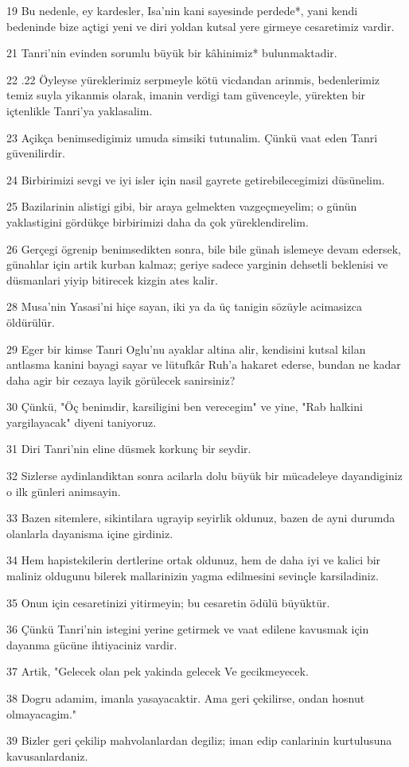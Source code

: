 \par 19 Bu nedenle, ey kardesler, Isa'nin kani sayesinde perdede*, yani kendi bedeninde bize açtigi yeni ve diri yoldan kutsal yere girmeye cesaretimiz vardir.
\par 21 Tanri'nin evinden sorumlu büyük bir kâhinimiz* bulunmaktadir.
\par 22 .22 Öyleyse yüreklerimiz serpmeyle kötü vicdandan arinmis, bedenlerimiz temiz suyla yikanmis olarak, imanin verdigi tam güvenceyle, yürekten bir içtenlikle Tanri'ya yaklasalim.
\par 23 Açikça benimsedigimiz umuda simsiki tutunalim. Çünkü vaat eden Tanri güvenilirdir.
\par 24 Birbirimizi sevgi ve iyi isler için nasil gayrete getirebilecegimizi düsünelim.
\par 25 Bazilarinin alistigi gibi, bir araya gelmekten vazgeçmeyelim; o günün yaklastigini gördükçe birbirimizi daha da çok yüreklendirelim.
\par 26 Gerçegi ögrenip benimsedikten sonra, bile bile günah islemeye devam edersek, günahlar için artik kurban kalmaz; geriye sadece yarginin dehsetli beklenisi ve düsmanlari yiyip bitirecek kizgin ates kalir.
\par 28 Musa'nin Yasasi'ni hiçe sayan, iki ya da üç tanigin sözüyle acimasizca öldürülür.
\par 29 Eger bir kimse Tanri Oglu'nu ayaklar altina alir, kendisini kutsal kilan antlasma kanini bayagi sayar ve lütufkâr Ruh'a hakaret ederse, bundan ne kadar daha agir bir cezaya layik görülecek sanirsiniz?
\par 30 Çünkü, "Öç benimdir, karsiligini ben verecegim" ve yine, "Rab halkini yargilayacak" diyeni taniyoruz.
\par 31 Diri Tanri'nin eline düsmek korkunç bir seydir.
\par 32 Sizlerse aydinlandiktan sonra acilarla dolu büyük bir mücadeleye dayandiginiz o ilk günleri animsayin.
\par 33 Bazen sitemlere, sikintilara ugrayip seyirlik oldunuz, bazen de ayni durumda olanlarla dayanisma içine girdiniz.
\par 34 Hem hapistekilerin dertlerine ortak oldunuz, hem de daha iyi ve kalici bir maliniz oldugunu bilerek mallarinizin yagma edilmesini sevinçle karsiladiniz.
\par 35 Onun için cesaretinizi yitirmeyin; bu cesaretin ödülü büyüktür.
\par 36 Çünkü Tanri'nin istegini yerine getirmek ve vaat edilene kavusmak için dayanma gücüne ihtiyaciniz vardir.
\par 37 Artik, "Gelecek olan pek yakinda gelecek Ve gecikmeyecek.
\par 38 Dogru adamim, imanla yasayacaktir. Ama geri çekilirse, ondan hosnut olmayacagim."
\par 39 Bizler geri çekilip mahvolanlardan degiliz; iman edip canlarinin kurtulusuna kavusanlardaniz.

